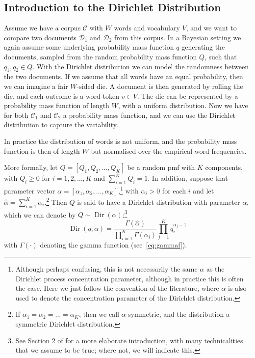 \subsection{Introduction to the Dirichlet Distribution}

Assume we have a corpus $\mathcal{C}$ with $W$ words and vocabulary $V$, and we want to compare two documents $\mathcal{D}_1$ and $\mathcal{D}_2$ from this corpus. In a Bayesian setting we again assume some underlying probability mass function $q$ generating the documents, sampled from the random probability mass function $Q$, such that $q_1,q_2\in Q$. With the Dirichlet distribution we can model the randomness between the two documents. If we assume that all words have an equal probability, then we can imagine a fair $W$-sided die. A document is then generated by rolling the die, and each outcome is a word token $v\in V$. The die can be represented by a probability mass function of length $W$, with a uniform distribution. Now we have for both $\mathcal{C}_1$ and $\mathcal{C}_2$ a probability mass function, and we can use the Dirichlet distribution to capture the variability.

In practice the distribution of words is not uniform, and the probability mass function is then of length $W$ but normalised over the empirical word frequencies. 

More formally, let $Q = [Q_1, Q_2, \ldots, Q_K]$ be a random pmf with $K$ components, with $Q_i \geq 0$ for $i = 1,2,\ldots,K$ and $\sum_{i=1}^K Q_i = 1$. In addition, suppose that parameter vector $\alpha = [\alpha_1,\alpha_2,\ldots,\alpha_K]$,\footnote{Although perhaps confusing, this is not necessarily the same $\alpha$ as the Dirichlet process concentration parameter, although in practice this is often the case. Here we just follow the convention of the literature, where $\alpha$ is also used to denote the concentration parameter of the Dirichlet distribution.} with $\alpha_i > 0$ for each $i$ and let $\hat{\alpha} = \sum_{i=1}^K \alpha_i$.\footnote{If $\alpha_1=\alpha_2=\ldots=\alpha_K$, then we call $\alpha$ symmetric, and the distribution a symmetric Dirichlet distribution.} Then $Q$ is said to have a Dirichlet distribution with parameter $\alpha$, which we can denote by $Q \sim \operatorname{Dir}(\alpha)$:\footnote{See Section 2 of \citet{Ferguson1973A} for a more elaborate introduction, with many technicalities that we assume to be true; where not, we will indicate this.\cite{Ferguson1973A}}
\begin{equation}
	\operatorname{Dir}(q; \alpha) = \frac{\Gamma(\hat{\alpha})}{\prod_{i=1}^K \Gamma(\alpha_i)} \prod_{j=1}^K q_i^{\alpha_j-1}
\end{equation}
with $\Gamma(\cdot)$ denoting the gamma function (see~\cref{eq:gammaf}).

